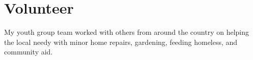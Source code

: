 \documentclass[]{resume-openfont}
\begin{document}
\begin{minipage}[t]{0.66\textwidth}

\section{Volunteer}
My youth group team worked with others from around the country on helping the local needy with minor home repairs, gardening, feeding homeless, and community aid.
\sectionsep

\end{minipage} 
\end{document}
